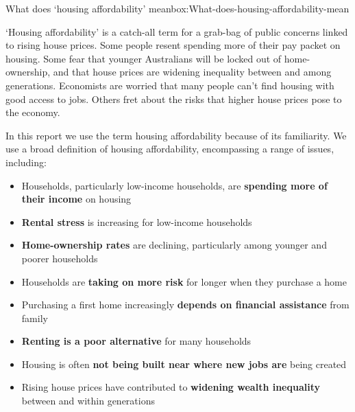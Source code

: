 \begin{smallbox}{What does `housing affordability' mean}{box:What-does-housing-affordability-mean}

`Housing affordability' is a catch-all term for a grab-bag of public concerns linked to rising house prices.
Some people resent spending more of their pay packet on housing. Some fear that younger Australians will be locked out of home-ownership, and that house prices are widening inequality between and among generations.
Economists are worried that many people can't find housing with good access to jobs.
Others fret about the risks that higher house prices pose to the economy.

In this report we use the term housing affordability because of its familiarity.
We use a broad definition of housing affordability, encompassing a  range of issues, including: 
\begin{itemize}
\item
Households, particularly low-income households, are \textbf{spending more of their income} on housing
\item
\textbf{Rental stress} is increasing for low-income households 
\item
\textbf{Home-ownership rates} are declining, particularly among younger and poorer households
\item
Households are \textbf{taking on more risk} for longer when they purchase a home
\item
Purchasing a first home increasingly \textbf{depends on financial assistance} from family
\item
\textbf{Renting is a poor alternative} for many households
\item
Housing is often \textbf{not being built near where new jobs are} being created
\item
Rising house prices have contributed to \textbf{widening wealth inequality} between and within generations
\end{itemize}


\end{smallbox}

